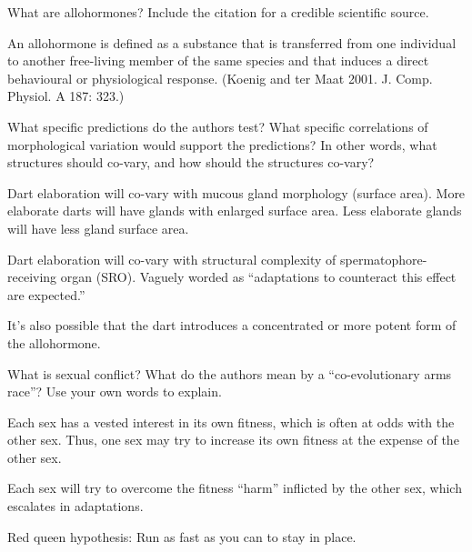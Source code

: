 \documentclass[12pt]{exam}
\begin{document}
\begin{questions}

\question[3]
What are allohormones? Include the citation for a credible scientific source.

\ifprintanswers
\begin{solution}
An allohormone is defined as a substance that is transferred from one individual to another free-living member of the same species and that induces a direct behavioural or physiological response. (Koenig and ter Maat 2001. J. Comp. Physiol. A 187: 323.)
\end{solution}
\else{}
\fi


\question[5]
 What specific predictions do the authors test? What specific
  correlations of morphological variation would support the predictions?
  In other words, what structures should co-vary, and how should the
  structures co-vary?

\ifprintanswers
\begin{solution}
Dart elaboration will co-vary with mucous gland morphology (surface area).  More elaborate darts will have glands with enlarged surface area.  Less elaborate glands will have less gland surface area.

Dart elaboration will co-vary with structural complexity of spermatophore-receiving organ (SRO). Vaguely worded as ``adaptations to counteract this effect are expected.''

It's also possible that the dart introduces a concentrated or more potent form of the allohormone.
\end{solution}
\else{}
\fi

\question[5]
What is sexual conflict? What do the authors mean by a
  ``co-evolutionary arms race''? Use your own words to explain.
  
\ifprintanswers\begin{solution}
Each sex has a vested interest in its own fitness, which is often at odds with the other sex.  Thus, one sex may try to increase its own fitness at the expense of the other sex.

Each sex will try to overcome the fitness ``harm'' inflicted by the other sex, which escalates in adaptations.

Red queen hypothesis: Run as fast as you can to stay in place.
\end{solution}
\else{}
\fi


\end{questions}
\end{document}
